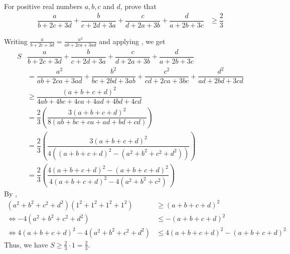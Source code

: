 \documentclass{subfile}
\begin{document}
		\begin{problem}
			For positive real numbers $a,b,c$ and $d$, prove that
				\begin{align*}
					\dfrac{a}{b+2c+3d}+\dfrac{b}{c+2d+3a}+\dfrac{c}{d+2a+3b}+\dfrac{d}{a+2b+3c}
						& \geq \dfrac{2}{3}
				\end{align*}
			
				\begin{solution}
					Writing $\frac{a}{b+2c+3d}=\frac{a^{2}}{ab+2ca+3ad}$ and applying , we get
						\begin{align*}
							S
								& \dfrac{a}{b+2c+3d}+\dfrac{b}{c+2d+3a}+\dfrac{c}{d+2a+3b}+\dfrac{d}{a+2b+3c}\\
								& = \dfrac{a^{2}}{ab+2ca+3ad}+\dfrac{b^{2}}{bc+2bd+3ab}+\dfrac{c^{2}}{cd+2ca+3bc}+\dfrac{d^{2}}{ad+2bd+3cd}\\
								& \geq \dfrac{(a+b+c+d)^{2}}{4ab+4bc+4ca+4ad+4bd+4cd}\\
								& = \dfrac{2}{3}\left(\dfrac{3(a+b+c+d)^{2}}{8(ab+bc+ca+ad+bd+cd)}\right)\\
								& = \dfrac{2}{3}\left(\dfrac{3(a+b+c+d)^{2}}{4\left((a+b+c+d)^{2}-(a^{2}+b^{2}+c^{2}+d^{2})\right)}\right)\\
								& = \dfrac{2}{3}\left(\dfrac{4(a+b+c+d)^{2}-(a+b+c+d)^{2}}{4(a+b+c+d)^{2}-4(a^{2}+b^{2}+c^{2})}\right)
						\end{align*}
					By ,
						\begin{align*}
							(a^{2}+b^{2}+c^{2}+d^{2})(1^{2}+1^{2}+1^{2}+1^{2})
								& \geq (a+b+c+d)^{2}\\
							\iff -4(a^{2}+b^{2}+c^{2}+d^{2})
								& \leq -(a+b+c+d)^{2}\\
							\iff 4(a+b+c+d)^{2}-4(a^{2}+b^{2}+c^{2}+d^{2})
								& \leq 4(a+b+c+d)^{2}-(a+b+c+d)^{2}
						\end{align*}
					Thus, we have $S\geq \frac{2}{3}\cdot1=\frac{2}{3}$.
				\end{solution}
		\end{problem}
	
\end{document}
